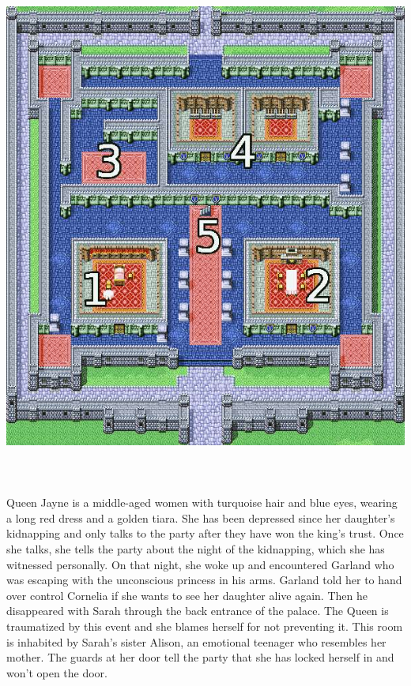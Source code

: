 %
\includegraphics[width=\columnwidth]{./art/chaosincornelia/castle.jpg}
%
\\\\
%
\\\\
%
 Queen Jayne is a middle-aged women with turquoise hair and blue eyes, wearing a long red dress and a golden tiara.
She has been depressed since her daughter's kidnapping and only talks to the party after they have won the king's trust.
Once she talks, she tells the party about the night of the kidnapping, which she has witnessed personally.
On that night, she woke up and encountered Garland who was escaping with the unconscious princess in his arms.
Garland told her to hand over control Cornelia if she wants to see her daughter alive again.
Then he disappeared with Sarah through the back entrance of the palace.
The Queen is traumatized by this event and she blames herself for not preventing it.
%
\ofpar
%
 This room is inhabited by Sarah's sister Alison, an emotional teenager who resembles her mother.
The guards at her door tell the party that she has locked herself in and won't open the door.
